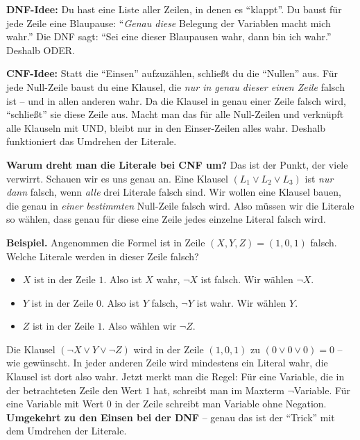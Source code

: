 \documentclass[a4paper,12pt]{article}
\begin{document}
\begin{analogie}[title={Analogie: Einsen zusammenf\"ugen, Nullen ausschlie{\ss}en}]
\textbf{DNF-Idee:} Du hast eine Liste aller Zeilen, in denen es
"`klappt"'. Du baust f\"ur jede Zeile eine Blaupause: "`\emph{Genau
diese} Belegung der Variablen macht mich wahr."' Die DNF sagt: "`Sei
eine dieser Blaupausen wahr, dann bin ich wahr."' Deshalb ODER.

\medskip
\textbf{CNF-Idee:} Statt die "`Einsen"' aufzuz\"ahlen, schlie{\ss}t du
die "`Nullen"' aus. F\"ur jede Null-Zeile baust du eine Klausel, die
\emph{nur in genau dieser einen Zeile} falsch ist -- und in allen
anderen wahr. Da die Klausel in genau einer Zeile falsch wird,
"`schlie{\ss}t"' sie diese Zeile aus. Macht man das f\"ur alle
Null-Zeilen und verkn\"upft alle Klauseln mit UND, bleibt nur in den
Einser-Zeilen alles wahr. Deshalb funktioniert das Umdrehen der
Literale.
\end{analogie}

\textbf{Warum dreht man die Literale bei CNF um?} Das ist der Punkt,
der viele verwirrt. Schauen wir es uns genau an. Eine Klausel
$(L_1 \vee L_2 \vee L_3)$ ist \emph{nur dann} falsch, wenn
\emph{alle} drei Literale falsch sind. Wir wollen eine Klausel bauen,
die genau in \emph{einer bestimmten} Null-Zeile falsch wird. Also
m\"ussen wir die Literale so w\"ahlen, dass genau f\"ur diese eine
Zeile jedes einzelne Literal falsch wird.

\textbf{Beispiel.} Angenommen die Formel ist in Zeile $(X,Y,Z) = (1,0,1)$ falsch.
Welche Literale werden in dieser Zeile falsch?
\begin{itemize}[nosep]
\item $X$ ist in der Zeile $1$. Also ist $X$ wahr, $\neg X$ ist falsch.
      Wir w\"ahlen $\neg X$.
\item $Y$ ist in der Zeile $0$. Also ist $Y$ falsch, $\neg Y$ ist wahr.
      Wir w\"ahlen $Y$.
\item $Z$ ist in der Zeile $1$. Also w\"ahlen wir $\neg Z$.
\end{itemize}
Die Klausel $(\neg X \vee Y \vee \neg Z)$ wird in der Zeile $(1,0,1)$
zu $(0 \vee 0 \vee 0) = 0$ -- wie gew\"unscht. In jeder anderen Zeile
wird mindestens ein Literal wahr, die Klausel ist dort also wahr.
Jetzt merkt man die Regel: F\"ur eine Variable, die in der
betrachteten Zeile den Wert $1$ hat, schreibt man im Maxterm
$\neg$Variable. F\"ur eine Variable mit Wert $0$ in der Zeile schreibt
man Variable ohne Negation. \textbf{Umgekehrt zu den Einsen bei der
DNF} -- genau das ist der "`Trick"' mit dem Umdrehen der Literale.
\end{document}
